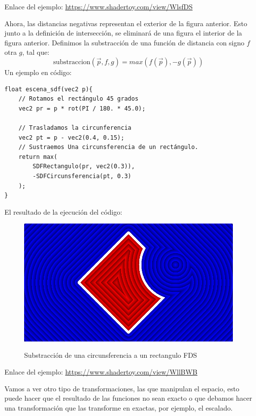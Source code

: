 Enlace del ejemplo:
\url{https://www.shadertoy.com/view/WlsfDS}

Ahora, las distancias negativas representan el exterior de la figura anterior. Esto junto a la definición de intersección, se eliminará de una figura el interior de la figura anterior. Definimos la substracción de una función de distancia con signo \(f\) otra \(g\), tal que:
\[\text{substraccion}(\Vec{p}, f,g)=max(f(\Vec{p}), -g(\Vec{p}))\]
Un ejemplo en código:
\begin{lstlisting}
float escena_sdf(vec2 p){
    // Rotamos el rectángulo 45 grados
    vec2 pr = p * rot(PI / 180. * 45.0);
    
    // Trasladamos la circunferencia
    vec2 pt = p - vec2(0.4, 0.15);
    // Sustraemos Una circunsferencia de un rectángulo.
    return max(
        SDFRectangulo(pr, vec2(0.3)),
        -SDFCircunsferencia(pt, 0.3)
    );
}
\end{lstlisting}
El resultado de la ejecución del código:
\begin{figure}[H]
  \centering
  \captionsetup{justification=centering}%
  \includegraphics[width=1.0\textwidth]{secciones/imagenes/sdf/2d/sdf_subtract-3.png}\label{fig:substraction}
  \caption{Substracción de una circunsferencia a un rectangulo FDS}
\end{figure}

Enlace del ejemplo:
\url{https://www.shadertoy.com/view/WllBWB}

Vamos a ver otro tipo de transformaciones, las que manipulan el espacio, esto puede hacer que el resultado de las funciones no sean exacto o que debamos hacer una transformación que las transforme en exactas, por ejemplo, el escalado.

